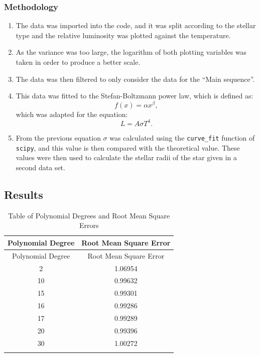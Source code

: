\documentclass[12pt, a4paper]{article}
\begin{document}
\subsubsection{Methodology}
\begin{enumerate}
    \item The data was imported into the code, and it was split according to the stellar type and the relative luminosity was plotted against the temperature. 
    \item As the variance was too large, the logarithm of both plotting variables was taken in order to produce a better scale. 
    \item The data was then filtered to only consider the data for the ``Main sequence''.
    \item This data was fitted to the Stefan-Boltzmann power law, which is defined as: 
    \begin{equation} 
        f(x) = \alpha x^{\beta} ,
    \end{equation}
    which was adapted for the equation:
    \begin{equation}
        L = A \sigma T^4 .
    \end{equation}
    \item From the previous equation \(\sigma\) was calculated using the \texttt{curve_fit} function of \texttt{scipy}, and this value is then compared with the theoretical value. These values were then used to calculate the stellar radii of the star given in a second data set.
\end{enumerate}

\subsection{Results}
\begin{longtable}{|c|c|}
    \hline Polynomial Degree & Root Mean Square Error \\ \hline
    \endfirsthead

    \hline Polynomial Degree & Root Mean Square Error \\ \hline
    \endhead

    2 & 1.06954\\ \hline
    10 & 0.99632 \\ \hline
    15 & 0.99301 \\ \hline
    16 & 0.99286 \\ \hline
    17 & 0.99289 \\ \hline
    20 & 0.99396 \\ \hline
    30 & 1.00272 \\ \hline

    \caption{Table of Polynomial Degrees and Root Mean Square Errors}
    \label{Tab: Table 2.1}\\
\end{longtable}
\end{document}
